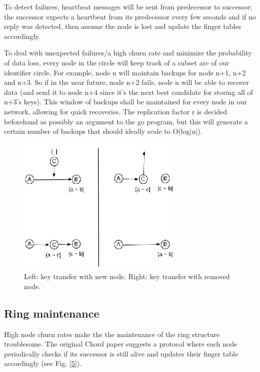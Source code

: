 \documentclass[fleqn,24pt]{SelfArx} %
\begin{document}
To detect failures, heartbeat messages will be sent from predecessor to successor; the successor expects a heartbeat from its predecessor every few seconds and if no reply was detected, then assume the node is lost and update the finger tables accordingly.

To deal with unexpected failures/a high churn rate and minimize the probability of data loss, every node in the circle will keep track of a subset arc of our identifier circle. For example, node n will maintain backups for node n+1, n+2 and n+3. So if in the near future, node n+2 fails, node n will be able to recover data (and send it to node n+4 since it’s the next best candidate for storing all of n+3’s keys). This window of backups shall be maintained for every node in our network, allowing for quick recoveries. The replication factor r  is decided beforehand as possibly an argument to the go program, but this will generate a certain number of backups that should ideally scale to O(log$|$n$|$).

\begin{figure}[!htb]
\includegraphics{figure1.png}
\caption{\label{family} Left: key transfer with new node. Right: key transfer with removed node.
}
\label{22}
\end{figure}

\subsection{Ring maintenance}

High node churn rates make the the maintenance of the ring structure troublesome. The original Chord paper \cite{2} suggests a protocol where each node periodically checks if its successor is still alive and updates their finger table accordingly (see Fig. \ref{5}). 
\end{document}
